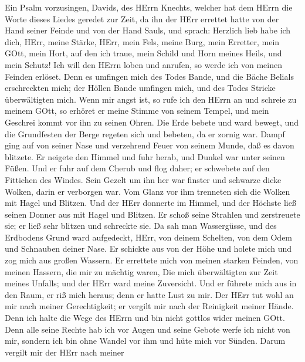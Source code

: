  Ein Psalm vorzusingen, Davids, des HErrn Knechts, welcher
hat dem HErrn die Worte dieses Liedes geredet zur Zeit, da ihn der HErr
errettet hatte von der Hand seiner Feinde und von der Hand Sauls,
 und sprach: Herzlich lieb habe ich dich, HErr, meine
Stärke,  HErr, mein Fels, meine Burg, mein Erretter, mein
GOtt, mein Hort, auf den ich traue, mein Schild und Horn meines Heils,
und mein Schutz!  Ich will den HErrn loben und anrufen, so
werde ich von meinen Feinden erlöset.  Denn es umfingen mich
des Todes Bande, und die Bäche Belials erschreckten mich; 
der Höllen Bande umfingen mich, und des Todes Stricke überwältigten
mich.  Wenn mir angst ist, so rufe ich den HErrn an und
schreie zu meinem GOtt, so erhöret er meine Stimme von seinem Tempel,
und mein Geschrei kommt vor ihn zu seinen Ohren.  Die Erde
bebete und ward bewegt, und die Grundfesten der Berge regeten sich und
bebeten, da er zornig war.  Dampf ging auf von seiner Nase
und verzehrend Feuer von seinem Munde, daß es davon blitzete.
 Er neigete den Himmel und fuhr herab, und Dunkel war unter
seinen Füßen.  Und er fuhr auf dem Cherub und flog daher;
er schwebete auf den Fittichen des Windes.  Sein Gezelt um
ihn her war finster und schwarze dicke Wolken, darin er verborgen war.
 Vom Glanz vor ihm trenneten sich die Wolken mit Hagel und
Blitzen.  Und der HErr donnerte im Himmel, und der Höchste
ließ seinen Donner aus mit Hagel und Blitzen.  Er schoß
seine Strahlen und zerstreuete sie; er ließ sehr blitzen und schreckte
sie.  Da sah man Wassergüsse, und des Erdbodens Grund ward
aufgedeckt, HErr, von deinem Schelten, von dem Odem und Schnauben deiner
Nase.  Er schickte aus von der Höhe und holete mich und zog
mich aus großen Wassern.  Er errettete mich von meinen
starken Feinden, von meinen Hassern, die mir zu mächtig waren,
 Die mich überwältigten zur Zeit meines Unfalls; und der
HErr ward meine Zuversicht.  Und er führete mich aus in den
Raum, er riß mich heraus; denn er hatte Lust zu mir.  Der
HErr tut wohl an mir nach meiner Gerechtigkeit; er vergilt mir nach der
Reinigkeit meiner Hände.  Denn ich halte die Wege des HErrn
und bin nicht gottlos wider meinen GOtt.  Denn alle seine
Rechte hab ich vor Augen und seine Gebote werfe ich nicht von mir,
 sondern ich bin ohne Wandel vor ihm und hüte mich vor
Sünden.  Darum vergilt mir der HErr nach meiner
